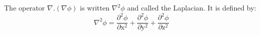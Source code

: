 The operator $ \nabla . ( \nabla \phi ) $ is written $ \nabla ^2 \phi $ and
called the Laplacian. It is defined by:
\[ \nabla ^2 \phi = \frac{\partial ^2 \phi}{\partial \mathrm{x} ^2}
+ \frac{\partial ^2 \phi}{\partial \mathrm{y} ^2}
+ \frac{\partial ^2 \phi}{\partial \mathrm{z} ^2} \]
